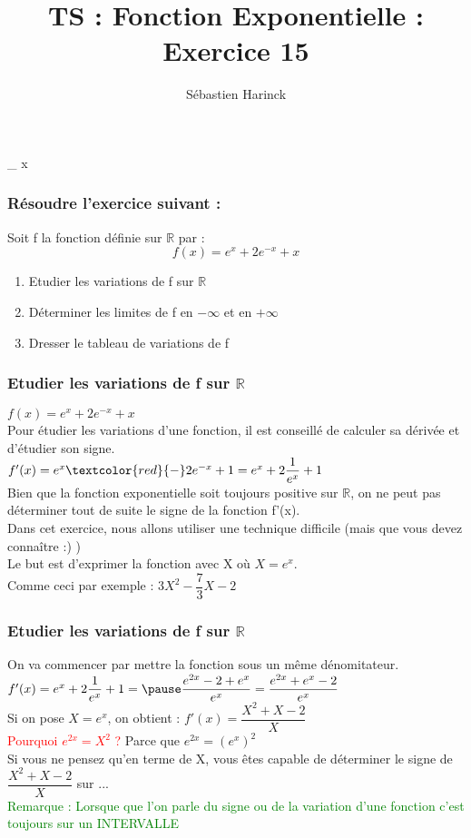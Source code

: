 \documentclass[t]{beamer}
\title{TS : Fonction Exponentielle : Exercice 15}
\author{Sébastien Harinck}
\institute{www.cours-futes.com}
\date{}
\begin{document}
\begin{frame}
\titlepage
\end{frame}

\lim\limits_{ x  }

\begin{frame}
\frametitle{Résoudre l'exercice suivant :}
Soit f la fonction définie sur $ \mathbb{R} $ par :
\pause
\[ f(x) = e^x + 2e^{-x} + x \]
\begin{enumerate}
\item<+-> Etudier les variations de f sur $ \mathbb{R} $
\item<+-> Déterminer les limites de f en $ - \infty $ et en $ + \infty $
\item<+-> Dresser le tableau de variations de f
\end{enumerate}
\end{frame}

\begin{frame}
\frametitle{Etudier les variations de f sur $ \mathbb{R} $}
\pause
\( f(x) = e^x + 2e^{-x} + x \)
\\
Pour étudier les variations d'une fonction, il est conseillé de calculer sa dérivée et d'étudier son signe.
\\
\pause
\( f'(x) =  e^x \textcolor{red}{-} 2e^{-x} + 1 = e^x + 2 \dfrac{1}{e^x} + 1 \)
\\
\pause
Bien que la fonction exponentielle soit toujours positive sur $ \mathbb{R} $, on ne peut pas déterminer tout de suite le signe de la fonction f'(x).
\\
\pause
Dans cet exercice, nous allons utiliser une technique difficile (mais que vous devez connaître :) )
\\
\pause
Le but est d'exprimer la fonction avec X où $ X =  e ^x $.
\\
\pause
Comme ceci par exemple : 
\( 3X^2 - \dfrac{7}{3}X - 2 \)
\\
\pause

\end{frame}

\begin{frame}
\frametitle{Etudier les variations de f sur $ \mathbb{R} $}
\pause
On va commencer par mettre la fonction sous un même dénomitateur.
\\
\pause
\( f'(x) = e^x + 2 \dfrac{1}{e^x} + 1  = \pause \dfrac{e^{2x} - 2 + e^x}{e^x} = \dfrac{e^{2x} + e^x - 2}{e^x} \)
\\
\pause
Si on pose $ X = e^x $, \pause on obtient :
\pause
\( f'(x) = \dfrac{X^2 + X - 2}{X} \)
\\
\pause
\textcolor{red}{Pourquoi $ e^{2x} = X^2 $ ?}
\pause
Parce que $ e^{2x} = (e^x)^2 $
\\
\pause
Si vous ne pensez qu'en terme de X, vous êtes capable de déterminer le signe de $\dfrac{X^2 + X - 2}{X}$ sur ...
\\
\pause
\textcolor{green}{Remarque : Lorsque que l'on parle du signe ou de la variation d'une fonction c'est toujours sur un INTERVALLE}

\end{frame}
\end{document}

